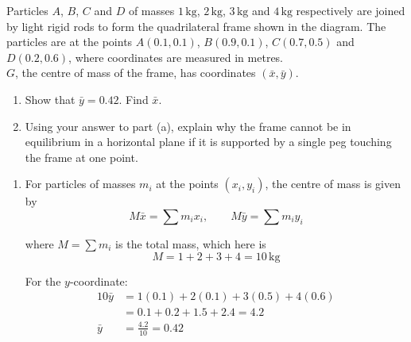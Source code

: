 \documentclass[leqno]{article}
\begin{document}
\begin{enumerate}[
  label=\textbf{\arabic*.},
  leftmargin=*,
  topsep=0pt,
  partopsep=0pt,
  parsep=0pt
]
\begin{figure}[H]
\end{figure}


Particles $A$, $B$, $C$ and $D$ of masses $1\,\mathrm{kg}$, $2\,\mathrm{kg}$, $3\,\mathrm{kg}$ and $4\,\mathrm{kg}$ respectively are joined by light rigid rods to form the quadrilateral frame shown in the diagram. The particles are at the points $A(0.1,0.1)$, $B(0.9,0.1)$, $C(0.7,0.5)$ and $D(0.2,0.6)$, where coordinates are measured in metres. \\

$G$, the centre of mass of the frame, has coordinates $(\bar{x},\bar{y})$. \\

\begin{enumerate}[label=\textbf{(\alph*)}]
  \item Show that $\bar{y}=0.42$. Find $\bar{x}$.  \\
  \item Using your answer to part (a), explain why the frame cannot be in equilibrium in a horizontal plane if it is supported by a single peg touching the frame at one point.  \\
\end{enumerate}

\vspace*{10pt}

\begin{djsSolution}
\begin{enumerate}[label=\textbf{(\alph*)}, start=1]
  \item For particles of masses \(m_i\) at the points \((x_i,y_i)\), the centre of mass is given by
  \[
  M\bar{x}=\sum m_ix_i,\qquad M\bar{y}=\sum m_iy_i
  \]

  where \(M=\sum m_i\) is the total mass, which here is
  \[
  M=1+2+3+4=10\,\mathrm{kg}
  \]

  For the \(y\)-coordinate:
  \begin{align*}
  10\bar{y}&=1(0.1)+2(0.1)+3(0.5)+4(0.6)\\
  &=0.1+0.2+1.5+2.4=4.2\\
  \bar{y}&=\frac{4.2}{10}=0.42
  \end{align*}


\end{enumerate}
\end{djsSolution}
\end{enumerate}
\end{document}
